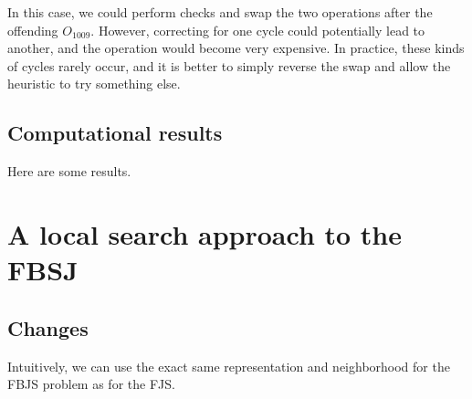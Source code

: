 \documentclass[a4paper,10pt]{article}
\begin{document}
In this case, we could perform checks and swap the two operations after the offending $O_{1009}$. However, correcting for one cycle could potentially lead to another, and the operation would become very expensive. In practice, these kinds of cycles rarely occur, and it is better to simply reverse the swap and allow the heuristic to try something else.

\subsection{Computational results}

Here are some results.

\section{A local search approach to the FBSJ}

\subsection{Changes}

Intuitively, we can use the exact same representation and neighborhood for the FBJS problem as for the FJS.

\printbibliography[heading=bibintoc]
\end{document}
